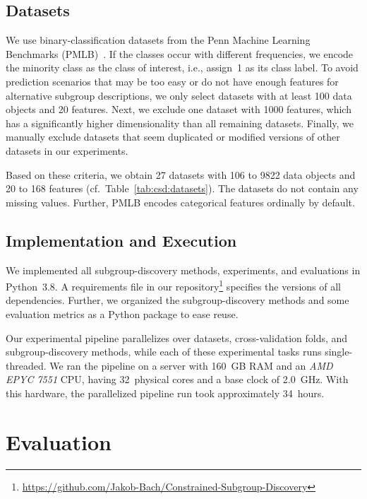 \documentclass{article}
\theoremstyle{definition}
\begin{document}
\subsection{Datasets}
\label{sec:csd:experimental-design:datasets}

We use binary-classification datasets from the Penn Machine Learning Benchmarks (PMLB)~\cite{olson2017pmlb, romano2021pmlb}.
If the classes occur with different frequencies, we encode the minority class as the class of interest, i.e., assign~1 as its class label.
To avoid prediction scenarios that may be too easy or do not have enough features for alternative subgroup descriptions, we only select datasets with at least 100 data objects and 20 features.
Next, we exclude one dataset with 1000 features, which has a significantly higher dimensionality than all remaining datasets.
Finally, we manually exclude datasets that seem duplicated or modified versions of other datasets in our experiments.

Based on these criteria, we obtain 27 datasets with 106 to 9822 data objects and 20 to 168 features (cf.~Table~\ref{tab:csd:datasets}).
The datasets do not contain any missing values.
Further, PMLB encodes categorical features ordinally by default.

\subsection{Implementation and Execution}
\label{sec:csd:experimental-design:implementation}

We implemented all subgroup-discovery methods, experiments, and evaluations in Python~3.8.
A requirements file in our repository\footnote{\url{https://github.com/Jakob-Bach/Constrained-Subgroup-Discovery}} specifies the versions of all dependencies.
Further, we organized the subgroup-discovery methods and some evaluation metrics as a Python package to ease reuse.

Our experimental pipeline parallelizes over datasets, cross-validation folds, and subgroup-discovery methods, while each of these experimental tasks runs single-threaded.
We ran the pipeline on a server with 160~GB RAM and an \emph{AMD EPYC 7551} CPU, having 32~physical cores and a base clock of 2.0~GHz.
With this hardware, the parallelized pipeline run took approximately 34~hours.

\section{Evaluation}
\label{sec:csd:evaluation}
\end{document}
